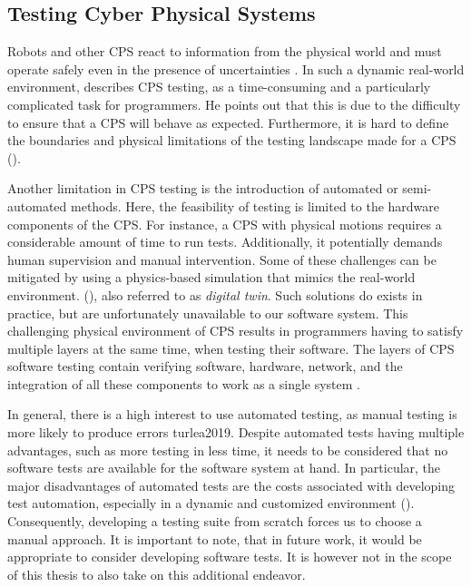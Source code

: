 \subsection{Testing Cyber Physical Systems}
\label{sec:cps}

Robots and other CPS react to information from the physical world and must operate safely even in the presence of uncertainties \cite{geissvolkermaria}. In such a dynamic real-world environment, \textcite{kapurpulkit2020} describes CPS testing, as a time-consuming and a particularly complicated task for programmers. He points out that this is due to the difficulty to ensure that a CPS will behave as expected. Furthermore, it is hard to define the boundaries and physical limitations of the testing landscape made for a CPS (\cite{abbaspourasadollah2015}). 

Another limitation in CPS testing is the introduction of automated or semi-automated methods. Here, the feasibility of testing is limited to the hardware components of the CPS. For instance, a CPS with physical motions requires a considerable amount of time to run tests. Additionally, it potentially demands human supervision and manual intervention. Some of these challenges can be mitigated by using a physics-based simulation that mimics the real-world environment. (\cite{kapurpulkit2020}), also referred to as \emph{digital twin}. Such solutions do exists in practice, but are unfortunately unavailable to our software system. This challenging physical environment of CPS results in programmers having to satisfy multiple layers at the same time, when testing their software. The layers of CPS software testing contain verifying software, hardware, network, and the integration of all these components to work as a single system \cite{abbaspourasadollah2015}.

In general, there is a high interest to use automated testing, as manual testing is more likely to produce errors {turlea2019}. Despite automated tests having multiple advantages, such as more testing in less time, it needs to be considered that no software tests are available for the software system at hand. In particular, the major disadvantages of automated tests are the costs associated with developing test automation, especially in a dynamic and customized environment (\cite{taipale2011}). Consequently, developing a testing suite from scratch forces us to choose a manual approach. It is important to note, that in future work, it would be appropriate to consider developing software tests. It is however not in the scope of this thesis to also take on this additional endeavor.

